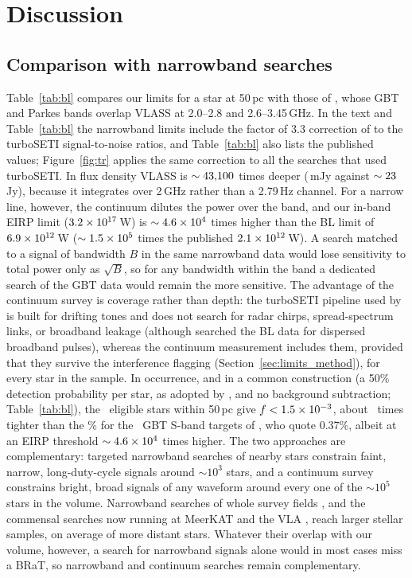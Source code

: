 \documentclass[linenumbers]{aastex702}
\begin{document}
\section{Discussion} \label{sec:discussion}

\subsection{Comparison with narrowband searches} \label{sec:bl}

Table~\ref{tab:bl} compares our limits for a star at 50\,pc with those of \citet{Price2020}, whose GBT and Parkes bands overlap VLASS at 2.0--2.8 and 2.6--3.45\,GHz. In the text and Table~\ref{tab:bl} the narrowband limits include the factor of 3.3 correction of \citet{Choza2024} to the turboSETI signal-to-noise ratios, and Table~\ref{tab:bl} also lists the published values; Figure~\ref{fig:tr} applies the same correction to all the searches that used turboSETI. In flux density VLASS is $\sim43{,}100$ times deeper (\VlassFiftyS\,mJy against $\sim23$\,Jy), because it integrates over 2\,GHz rather than a 2.79\,Hz channel. For a narrow line, however, the continuum dilutes the power over the band, and our in-band EIRP limit ($3.2\times10^{17}$\,W) is $\sim4.6\times10^{4}$ times higher than the BL limit of $6.9\times10^{12}$\,W ($\sim1.5\times10^{5}$ times the published $2.1\times10^{12}$\,W). A search matched to a signal of bandwidth $B$ in the same narrowband data would lose sensitivity to total power only as $\sqrt{B}$, so for any bandwidth within the band a dedicated search of the GBT data would remain the more sensitive. The advantage of the continuum survey is coverage rather than depth: the turboSETI pipeline \citep{Enriquez2019} used by \citet{Price2020} is built for drifting tones and does not search for radar chirps, spread-spectrum links, or broadband leakage (although \citealt{Gajjar2022} searched the BL data for dispersed broadband pulses), whereas the continuum measurement includes them, provided that they survive the interference flagging (Section~\ref{sec:limits_method}), for every star in the sample. In occurrence, and in a common construction (a 50\% detection probability per star, as adopted by \citealt{Price2020}, and no background subtraction; Table~\ref{tab:bl}), the \NFifty\ eligible stars within 50\,pc give $f<1.5\times10^{-3}$, about \FFiftyRatio\ times tighter than the \BLfCommon\% for the \NGBTS\ GBT S-band targets of \citet{Price2020}, who quote 0.37\%, albeit at an EIRP threshold $\sim4.6\times10^{4}$ times higher. The two approaches are complementary: targeted narrowband searches of nearby stars constrain faint, narrow, long-duty-cycle signals around $\sim10^3$ stars, and a continuum survey constrains bright, broad signals of any waveform around every one of the $\sim10^5$ stars in the volume. Narrowband searches of whole survey fields \citep[e.g.,][]{Wlodarczyk2020}, and the commensal searches now running at MeerKAT and the VLA \citep{Czech2021,Tremblay2025}, reach larger stellar samples, on average of more distant stars. Whatever their overlap with our volume, however, a search for narrowband signals alone would in most cases miss a BRaT, so narrowband and continuum searches remain complementary.
\end{document}
